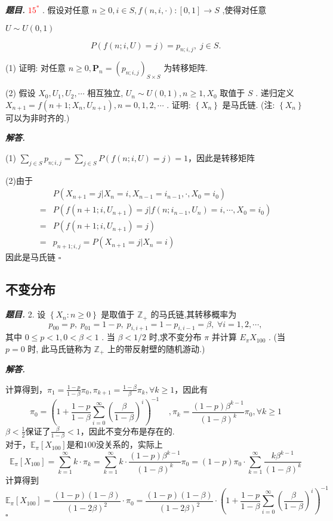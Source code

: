 \documentclass[10pt, a4paper, oneside]{ctexart}
\newenvironment{problem}{\begin{framed}\par\noindent\textbf{\textit{题目. }}}{\end{framed}\par}
\newenvironment{solution}{%
  \par\noindent\textbf{\textit{解答. }}\ignorespaces
}{%
  \hfill\ensuremath{\square}\par %
}
\begin{document}
\begin{problem}
\textcolor{red}{${15}^{ * }$} . 假设对任意 $n \geq 0,i \in S,f\left( {n,i, \cdot }\right) : \left\lbrack {0,1}\right\rbrack \rightarrow S$ ,使得对任意

$U \sim U\left( {0,1}\right)$

$$
P\left( {f\left( {n;i,U}\right) = j}\right) = {p}_{n;i,j},\;j \in S.
$$

(1) 证明: 对任意 $n \geq 0,{\mathbf{P}}_{n} = {\left( {p}_{n;i,j}\right) }_{S \times S}$ 为转移矩阵.

(2) 假设 ${X}_{0},{U}_{1},{U}_{2},\cdots$ 相互独立, ${U}_{n} \sim U\left( {0,1}\right) ,n \geq 1,{X}_{0}$ 取值于 $S$ . 递归定义 ${X}_{n + 1} = f\left( {n + 1;{X}_{n},{U}_{n + 1}}\right) ,n = 0,1,2,\cdots$ . 证明: $\left\{ {X}_{n}\right\}$ 是马氏链. (注: $\left\{ {X}_{n}\right\}$ 可以为非时齐的.)
\end{problem}
\begin{solution}
(1) $\sum_{j\in S}p_{n;i,j}=\sum_{j\in S}P(f(n;i,U)=j)=1$，因此是转移矩阵

(2)由于
\begin{align*}
&P(X_{n+1}=j|X_n=i,X_{n-1}=i_{n-1},\cdot,X_0=i_0)\\
=&P(f(n+1;i,U_{n+1})=j|f(n;i_{n-1},U_n)=i,\cdots,X_0=i_0)\\
=&P(f(n+1;i,U_{n+1})=j)\\
=&p_{n+1;i,j}=P(X_{n+1}=j|X_n=i)
\end{align*}
因此是马氏链
\end{solution}

\subsection{不变分布}
\begin{problem}
    2. 设 \( \left\{  {{X}_{n} : n \geq  0}\right\}   \) 是取值于 \( {\mathbb{Z}}_{ + } \) 的马氏链,其转移概率为
\[{p}_{00} = p,\;{p}_{01} = 1 - p,\;{p}_{i,i + 1} = 1 - {p}_{i,i - 1} = \beta ,\;\forall i = 1,2,\cdots ,\]
其中 \( 0 \leq  p < 1,0 < \beta  < 1 \) . 当 \( \beta  < 1/2 \) 时,求不变分布 \( \pi  \) 并计算 \( {E}_{\pi }{X}_{100} \) . (当 \( p = 0 \) 时,  此马氏链称为 \( {\mathbb{Z}}_{ + } \) 上的带反射壁的随机游动.)
\end{problem}
\begin{solution}
   计算得到，$\pi_1=\frac{1-p}{1-\beta}\pi_0,\pi_{k+1}=\frac{1-\beta}{\beta}\pi_{k},\forall k\geq 1$，因此有
    $$\pi_0=(1+\frac{1-p}{1-\beta}\sum_{i=0}^{\infty}(\frac{\beta}{1-\beta})^i)^{-1}\;\;\;\;, \pi_k=\frac{(1-p)\beta^{k-1}}{(1-\beta)^k}\pi_0,\forall k\geq 1$$
$\beta<\frac{1}{2}$保证了$\frac{\beta}{1-\beta}<1$，因此不变分布是存在的.\\
对于，$\mathbb{E}_{\pi}[X_{100}]$是和$100$没关系的，实际上
$$\mathbb{E}_{\pi}[X_{100}]=\sum_{k=1}^{\infty}k\cdot \pi_k=\sum_{k=1}^{\infty}k\cdot \frac{(1-p)\beta^{k-1}}{(1-\beta)^k}\pi_0=(1-p)\pi_0\cdot \sum_{k=1}^{\infty}\frac{k\beta^{k-1}}{(1-\beta)^k}$$
计算得到
$$\mathbb{E}_{\pi}[X_{100}]=\frac{(1-p)(1-\beta)}{(1-2\beta)^2}\cdot \pi_0=\frac{(1-p)(1-\beta)}{(1-2\beta)^2}\cdot (1+\frac{1-p}{1-\beta}\sum_{i=0}^{\infty}(\frac{\beta}{1-\beta})^i)^{-1}$$
\end{solution}
\end{document}
